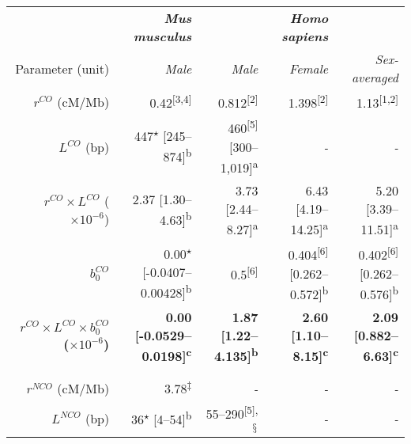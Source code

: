 \begin{sidewaystable}[p]
    \centering
	\begin{adjustbox}{width=\textwidth}
    \begin{tabular}{rrrrr}
        
        \toprule
        & \textbf{\textit{Mus musculus}} &  & \textbf{\textit{Homo sapiens}} &  \\
        \cmidrule(l){2-2} \cmidrule(l){3-5}
        Parameter (unit) & \textit{Male} & \textit{Male} & \textit{Female} & \textit{Sex-averaged} \\
        
        \cmidrule(l){1-1} \cmidrule(l){2-2} \cmidrule(l){3-5}
        
        $r^{CO}$ (cM/Mb)    & 0.42\textsuperscript{[3,4]} & 0.812\textsuperscript{[2]} & 1.398\textsuperscript{[2]} & 1.13\textsuperscript{[1,2]} \\
        $L^{CO}$ (bp)       & 447\textsuperscript{$\star$} [245--874]\textsuperscript{b} & 460\textsuperscript{[5]} [300--1,019]\textsuperscript{a} & \textit{-} & \textit{-} \\
        $r^{CO} \times L^{CO}$ ($\times 10^{-6}$)      & 2.37 [1.30--4.63]\textsuperscript{b} & 3.73 [2.44--8.27]\textsuperscript{a} & 6.43 [4.19--14.25]\textsuperscript{a} & 5.20 [3.39--11.51]\textsuperscript{a} \\
        $b_0^{CO}$          & 0.00\textsuperscript{$\star$} [-0.0407--0.00428]\textsuperscript{b} & 0.5\textsuperscript{[6]} & 0.404\textsuperscript{[6]} [0.262--0.572]\textsuperscript{b} & 0.402\textsuperscript{[6]} [0.262--0.576]\textsuperscript{b}  \\
        \textbf{$r^{CO} \times L^{CO} \times b_0^{CO}$ ($\times 10^{-6}$)}      & \textbf{0.00 [-0.0529--0.0198]\textsuperscript{c}} & \textbf{1.87 [1.22--4.135]\textsuperscript{b}} & \textbf{2.60 [1.10--8.15]\textsuperscript{c}} & \textbf{2.09 [0.882--6.63]\textsuperscript{c}} \\
		\\
		\midrule
        \\
        $r^{NCO}$ (cM/Mb)   & 3.78\textsuperscript{$\ddagger$} & \textit{-} & \textit{-} & \textit{-} \\
        $L^{NCO}$ (bp)      & 36\textsuperscript{$\star$} [4--54]\textsuperscript{b} & 55--290\textsuperscript{[5],$\mathsection$} & \textit{-} & \textit{-} \\

\end{tabular}
\end{adjustbox}
\end{sidewaystable}
